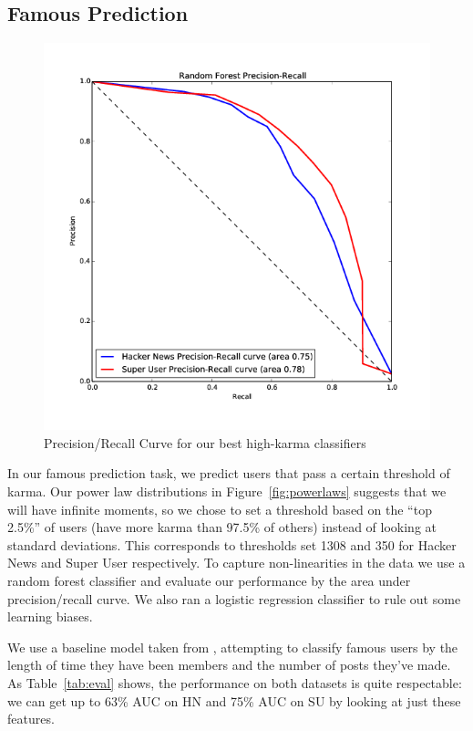 \documentclass[11pt]{article}
\begin{document}
\subsection{Famous Prediction}
\label{sec:classification}

\begin{figure}[h]
\centering
\includegraphics[width=\linewidth]{classification_pr_curve-png}
\caption{Precision/Recall Curve for our best high-karma classifiers}
\label{fig:classification}
\end{figure}
In our famous prediction task, we predict users that
pass a certain threshold of karma. Our power law distributions in
Figure~\ref{fig:powerlaws} suggests that we will have infinite moments, so we
chose to set a threshold based on the ``top 2.5\%'' of users (have more karma
than 97.5\% of others) instead of looking at standard deviations. This
corresponds to thresholds set 1308 and 350 for Hacker News and Super User
respectively.  To capture non-linearities in the data we use a random forest
classifier and evaluate our performance by the area under precision/recall
curve. We also ran a logistic regression classifier to rule out some 
learning biases.

We use a baseline model taken from \citet{movshovitzanalysis}, attempting to
classify famous users by the length of time they have been members and the
number of posts they've made. As Table~\ref{tab:eval} shows, the performance on
both datasets is quite respectable: we can get up to 63\% AUC on HN and 75\% AUC
on SU by looking at just these features.
\end{document}
